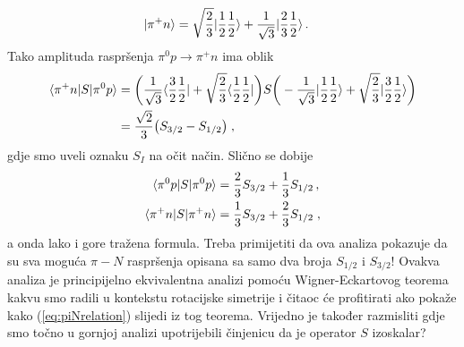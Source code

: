 \begin{primjer}
\begin{align}
| \pi^+ n \rangle &= \sqrt{\frac{2}{3}} | \frac{1}{2} \frac{1}{2} \rangle + 
\frac{1}{\sqrt{3}} | \frac{2}{3} \frac{1}{2} \rangle \,.
\end{align}
Tako amplituda raspršenja $\pi^0 p \to \pi^+ n$ ima oblik
\begin{align}
\langle \pi^+ n |S| \pi^0 p  \rangle &=
\bigg( \frac{1}{\sqrt{3}} \langle \frac{3}{2} \frac{1}{2} | + \sqrt{\frac{2}{3}}
\langle \frac{1}{2} \frac{1}{2} | \bigg) S
\bigg(-\frac{1}{\sqrt{3}} | \frac{1}{2} \frac{1}{2} \rangle +\sqrt{\frac{2}{3}} | \frac{3}{2}\frac{1}{2} \rangle \bigg) \\
&= \frac{\sqrt{2}}{3} \big( S_{3/2} - S_{1/2} \big) \;,
\end{align}
gdje smo uveli oznaku $S_I$ na očit način. Slično se dobije
\begin{align}
\langle \pi^0 p |S| \pi^0 p  \rangle &= \frac{2}{3}S_{3/2} + \frac{1}{3} S_{1/2} \,, \\
\langle \pi^+ n |S| \pi^+ n  \rangle &= \frac{1}{3}S_{3/2} + \frac{2}{3} S_{1/2}  \;,
\end{align}
a onda lako i gore tražena formula.
Treba primijetiti da ova analiza pokazuje da su sva moguća $\pi - N$ raspršenja
opisana sa samo dva broja $S_{1/2}$ i $S_{3/2}$!
Ovakva analiza je principijelno ekvivalentna analizi pomoću Wigner-Eckartovog
teorema kakvu smo radili u kontekstu rotacijske simetrije i
čitaoc će profitirati ako pokaže kako (\ref{eq:piNrelation}) slijedi
iz tog teorema.  Vrijedno je također razmisliti gdje smo točno u gornjoj analizi
upotrijebili činjenicu da je operator $S$ izoskalar?
\end{primjer}

